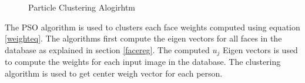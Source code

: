 \documentclass[a4paper,twoside]{article}
\begin{document}
\begin{figure}
 \begin{center}
 \centering
\caption{ Particle Clustering Alogirhtm}
\label{fig:PSOswarm}
 \end{center}\end{figure}


The PSO algorithm is used to clusters each face weights computed using equation \ref{weighteq}. The algorithms first compute the eigen vectors for all faces in the database as explained in section \ref{facereg}. The computed $u_j$ Eigen vectors is used to compute the weights for each input image in the database. The clustering algorithm is used to get center weigh vector for each person. %
\end{document}
